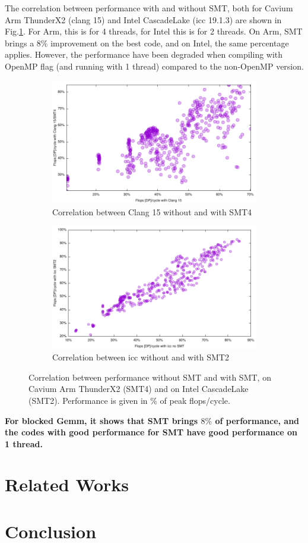 \documentclass{article}
\begin{document}
The correlation between performance with and without SMT, both for Cavium Arm ThunderX2 (clang 15) and Intel CascadeLake (icc 19.1.3) are shown in Fig.\ref{fig:SMT}. For Arm, this is for 4 threads, for Intel this is for 2 threads. On Arm, SMT brings a $8\%$ improvement on the best code, and on Intel, the same percentage applies. However, the performance have been degraded when compiling with OpenMP flag (and running with 1 thread) compared to the non-OpenMP version.
\begin{figure}[h!]
  \begin{subfigure}[h]{0.45\textwidth}  
\includegraphics[width=\textwidth]{../benches/gemm/arm-64x256x64/clangxsmt.pdf}
  \caption{Correlation between Clang 15 without and with SMT4}
  \end{subfigure}
    \begin{subfigure}[h]{0.45\textwidth}  
\includegraphics[width=\textwidth]{../benches/gemm/cascadelake-64x256x64/icc1thx2th.pdf}
  \caption{Correlation between icc without and with SMT2}
    \end{subfigure}
    \caption{Correlation between performance without SMT and with SMT, on Cavium Arm ThunderX2 (SMT4) and on Intel CascadeLake (SMT2). Performance is given in \% of peak flops/cycle. \label{fig:SMT}}
\end{figure}

\textbf{For blocked  Gemm, it shows that SMT brings $8\%$ of performance, and the codes with good performance for SMT have good performance on 1 thread.} 
\section{Related Works}
\section{Conclusion}
\label{sec:conclusion}


\end{document}
